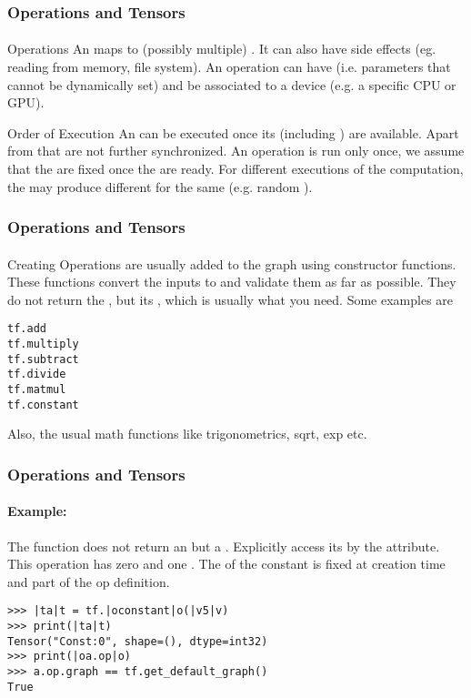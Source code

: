 \begin{frame}
    \frametitle{Operations and Tensors}
    \framesubtitle{}
    \begin{block}{Operations}
        An  maps  to (possibly multiple) . 
        It can also have side effects (eg. reading from memory, file system). An operation
        can have  (i.e. parameters that cannot be dynamically set) and be associated
        to a device (e.g. a specific CPU or GPU).
    \end{block}
    \pause
    \begin{block}{Order of Execution}
        An  can be executed once its  (including )
        are available. Apart from that  are not further synchronized. An operation is run 
        only once, we assume that the  are fixed once the  are ready. For different 
        executions of the computation, the  may produce different  for
        the same  (e.g. random ).
    \end{block}
\end{frame}


\begin{frame}[fragile]
    \frametitle{Operations and Tensors}
    \framesubtitle{}
    \begin{block}{Creating Operations}
         are usually added to the graph using constructor functions. 
        These functions convert the inputs to  and validate 
        them as far as possible. They do not return the , but its ,
        which is usually what you need.
        Some examples are
        \begin{lstlisting}
tf.add
tf.multiply
tf.subtract
tf.divide
tf.matmul
tf.constant
        \end{lstlisting}
        Also, the usual math functions like trigonometrics, sqrt, exp etc.
    \end{block}
\end{frame}


\begin{frame}[fragile]
    \frametitle{Operations and Tensors}
    \framesubtitle{Example: }
    \begin{block}{}
        The  function does not return an  but a . 
        Explicitly access its  by the  attribute. 
        This operation has zero  and one . The  of the constant is fixed at 
        creation time and part of the op definition.
        \begin{lstlisting}
>>> |ta|t = tf.|oconstant|o(|v5|v)
>>> print(|ta|t)
Tensor("Const:0", shape=(), dtype=int32)
>>> print(|oa.op|o)
>>> a.op.graph == tf.get_default_graph()
True
        \end{lstlisting}
    \end{block}
\end{frame}

